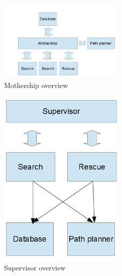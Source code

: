 \begin{figure}[h]
	\centering
		\includegraphics[width=6cm]{mothership}
	\caption{Mothership overview}
	\label{fig:mothership}
\end{figure}

\begin{figure}[h]
	\centering
		\includegraphics[width=6cm]{supervisor}
	\caption{Supervisor overview}
	\label{fig:supervisor}
\end{figure}
